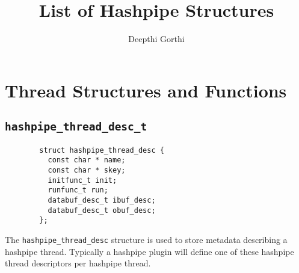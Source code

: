 \documentclass[12pt]{article}
\def\clst{\lstinline[basicstyle=\ttfamily,breaklines=true,language=C]}
\begin{document}
\title{List of Hashpipe Structures} \author{Deepthi Gorthi}
\maketitle

\section{Thread Structures and Functions}

\subsection{\clst{hashpipe_thread_desc_t}}

\begin{lstlisting}
        struct hashpipe_thread_desc {
          const char * name;
          const char * skey;
          initfunc_t init;
          runfunc_t run;
          databuf_desc_t ibuf_desc;
          databuf_desc_t obuf_desc;
        };
\end{lstlisting}

The \clst{hashpipe_thread_desc} structure is used to store metadata 
describing a hashpipe thread.  Typically a hashpipe plugin will 
define one of these hashpipe thread descriptors per hashpipe thread.  
\end{document}
